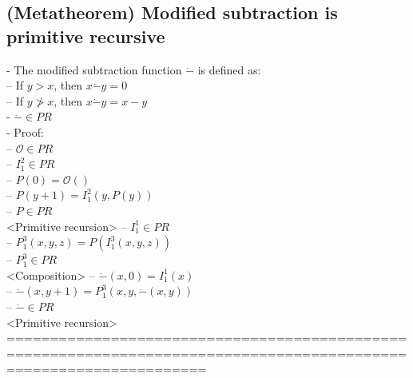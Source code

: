 \documentclass{book}
\newcommand{\inot}{\not}
\begin{document}
\subsection{(Metatheorem) Modified subtraction is primitive recursive} %
	- The modified subtraction function $\dot{-}$ is defined as: \\
		-- If $y > x$, then $x \dot{-} y = 0$ \\
		-- If $y \inot > x$, then	$x \dot{-} y = x - y$ \\
	- $\dot{-} \in PR$ \\
	- Proof: \\ 
		-- $\mathcal{O} \in PR$ \\
		-- $I_1^2 \in PR$ \\
		-- $P(0) = \mathcal{O}()$ \\
		-- $P(y+1) = I_1^2(y, P(y))$ \\
		-- $P \in PR$ \\ <Primitive recursion>
		-- $I_1^1 \in PR$ \\
		-- $P_1^3(x, y, z) = P(I_1^3(x, y, z))$ \\
		-- $P_1^3 \in PR$ \\ <Composition>
		-- $\dot{-}(x, 0) = I_1^1(x)$ \\
		-- $\dot{-}(x, y+1) = P_1^3(x, y, \dot{-}(x, y))$ \\
		-- $\dot{-} \in PR$ \\ <Primitive recursion>
	===================================================================================================================
\end{document}
